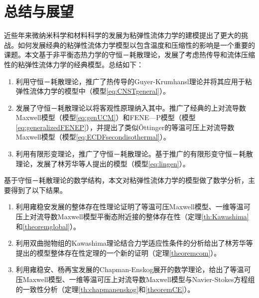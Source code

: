 \chapter{总结与展望}

% 
近些年来微纳米科学和材料科学的发展为粘弹性流体力学的建模提出了更大的挑战。如何发展经典的粘弹性流体力学模型以包含温度和压缩性的影响是一个重要的课题。本文基于非平衡态热力学的守恒－耗散理论，发展了考虑热传导和流体压缩性的粘弹性流体力学的经典模型。总结如下：
\begin{enumerate}
	\item 利用守恒－耗散理论，推广了热传导的Guyer-Krumhansl理论并将其应用于粘弹性流体力学的模型中（模型\eqref{eq:CNSTgeneral}）。
	\item 发展了守恒－耗散理论以将客观性原理纳入其中。推广了经典的上对流导数Maxwell模型（模型\eqref{eq:genUCM}）和FENE—P模型（模型\eqref{eq:generalizedFENEP}），并提出了类似\"Ottinger的等温可压上对流导数Maxwell模型（模型\eqref{eq:ECDFsecondisothermal}）。
	\item 利用有限形变理论，推广了守恒－耗散理论。基于推广的有限形变守恒－耗散理论，发展了林芳华等人提出的模型（模型\eqref{eq:lingen}）。
\end{enumerate}

基于守恒－耗散理论的数学结构，本文对粘弹性流体力学的模型做了数学分析，主要得到了以下结果。
\begin{enumerate}
	\item 利用雍稳安发展的整体存在性理论证明了等温可压Maxwell模型、一维等温可压上对流导数Maxwell模型平衡态附近接的整体存在性（定理\ref{th:Kawashima}和\ref{theoremglobal}）。
	\item 利用双曲抛物组的Kawashima理论结合力学适应性条件的分析给出了林芳华等提出的模型整体存在性定理的一个新的证明（定理\ref{theoremcom}）。
	\item 利用雍稳安、杨再宝发展的Chapman-Enskog展开的数学理论，给出了等温可压Maxwell模型、一维等温可压上对流导数Maxwell模型与Navier-Stokes方程组的一致性分析（定理\ref{th:chapmanenskog}和\ref{theoremCE}）。
\end{enumerate}

